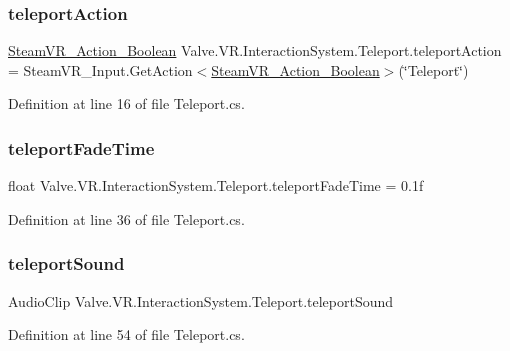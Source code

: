 \subsubsection{\texorpdfstring{teleportAction}{teleportAction}}
{\footnotesize\ttfamily \mbox{\hyperlink{class_valve_1_1_v_r_1_1_steam_v_r___action___boolean}{Steam\+V\+R\+\_\+\+Action\+\_\+\+Boolean}} Valve.\+V\+R.\+Interaction\+System.\+Teleport.\+teleport\+Action = Steam\+V\+R\+\_\+\+Input.\+Get\+Action$<$\mbox{\hyperlink{class_valve_1_1_v_r_1_1_steam_v_r___action___boolean}{Steam\+V\+R\+\_\+\+Action\+\_\+\+Boolean}}$>$(\char`\"{}Teleport\char`\"{})}



Definition at line 16 of file Teleport.\+cs.

\mbox{\label{class_valve_1_1_v_r_1_1_interaction_system_1_1_teleport_a6ab68fe982172e649ee8438472402cde}} 
\subsubsection{\texorpdfstring{teleportFadeTime}{teleportFadeTime}}
{\footnotesize\ttfamily float Valve.\+V\+R.\+Interaction\+System.\+Teleport.\+teleport\+Fade\+Time = 0.\+1f}



Definition at line 36 of file Teleport.\+cs.

\mbox{\label{class_valve_1_1_v_r_1_1_interaction_system_1_1_teleport_a49d2930e9eeb0edeb9072684115bdc77}} 
\subsubsection{\texorpdfstring{teleportSound}{teleportSound}}
{\footnotesize\ttfamily Audio\+Clip Valve.\+V\+R.\+Interaction\+System.\+Teleport.\+teleport\+Sound}



Definition at line 54 of file Teleport.\+cs.

